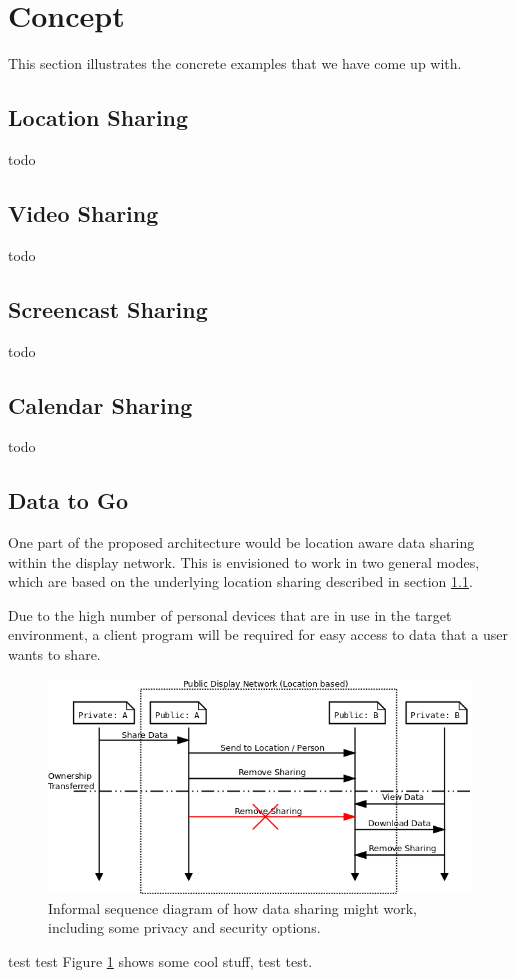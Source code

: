 \section{Concept}

This section illustrates the concrete examples that we have come up with.

\subsection{Location Sharing}
\label{location_sharing}

todo

\subsection{Video Sharing}

todo

\subsection{Screencast Sharing}

todo

\subsection{Calendar Sharing}

todo

\subsection{Data to Go}

One part of the proposed architecture would be location aware data sharing within the display network.
This is envisioned to work in two general modes, which are based on the underlying location sharing described in section \ref{location_sharing}.

Due to the high number of personal devices that are in use in the target environment, a client program will be required for easy access to data that a user wants to share.

\begin{figure}
	\centering
	\includegraphics[width=\linewidth]{img/data_sharing.png}
	\caption[Data Sharing Sequence]{Informal sequence diagram of how data sharing might work, including some privacy and security options.}
	\label{data_share_sequence}
\end{figure}

test test
Figure \ref{data_share_sequence} shows some cool stuff, test test.

